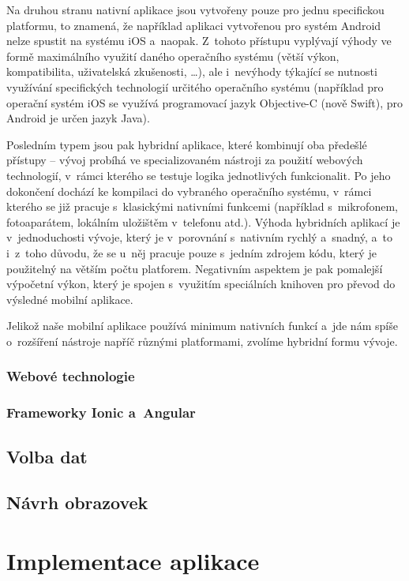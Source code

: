 Na druhou stranu nativní aplikace jsou vytvořeny pouze pro jednu
specifickou platformu, to znamená, že například aplikaci vytvořenou pro
systém Android nelze spustit na systému iOS a~naopak. Z~tohoto přístupu
vyplývají výhody ve formě maximálního využití daného operačního systému
(větší výkon, kompatibilita, uživatelská zkušenosti, \ldots{}), ale
i~nevýhody týkající se nutnosti využívání specifických technologií
určitého operačního systému (například pro operační systém iOS se
využívá programovací jazyk Objective-C (nově Swift), pro Android je
určen jazyk Java).

Posledním typem jsou pak hybridní aplikace, které kombinují oba předešlé
přístupy -- vývoj probíhá ve specializovaném nástroji za použití
webových technologií, v~rámci kterého se testuje logika jednotlivých
funkcionalit. Po jeho dokončení dochází ke kompilaci do vybraného
operačního systému, v~rámci kterého se již pracuje s~klasickými
nativními funkcemi (například s~mikrofonem, fotoaparátem, lokálním
uložištěm v~telefonu atd.). Výhoda hybridních aplikací je
v~jednoduchosti vývoje, který je v~porovnání s~nativním rychlý a~snadný,
a~to i~z~toho důvodu, že se u~něj pracuje pouze s~jedním zdrojem kódu,
který je použitelný na větším počtu platforem. Negativním aspektem je
pak pomalejší výpočetní výkon, který je spojen s~využitím speciálních
knihoven pro převod do výsledné mobilní aplikace.

Jelikož naše mobilní aplikace používá minimum nativních funkcí a~jde nám
spíše o~rozšíření nástroje napříč různými platformami, zvolíme hybridní
formu vývoje.

\hypertarget{webovuxe9-technologie}{%
\subsubsection{Webové technologie}\label{webovuxe9-technologie}}

\hypertarget{frameworky-ionic-a-angular}{%
\subsubsection{Frameworky Ionic
a~Angular}\label{frameworky-ionic-a-angular}}

\hypertarget{volba-dat}{%
\subsection{Volba dat}\label{volba-dat}}

\hypertarget{nuxe1vrh-obrazovek}{%
\subsection{Návrh obrazovek}\label{nuxe1vrh-obrazovek}}

\hypertarget{implementace-aplikace}{%
\section{Implementace aplikace}\label{implementace-aplikace}}
